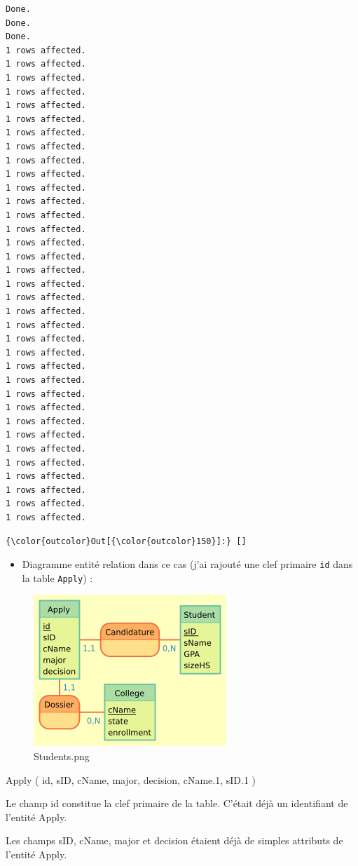 \documentclass[11pt]{article}
\makeatletter
\def\maxwidth{\ifdim\Gin@nat@width>\linewidth\linewidth
    \else\Gin@nat@width\fi}
\let\Oldincludegraphics\includegraphics
\renewcommand{\includegraphics}[1]{\Oldincludegraphics[width=.8\maxwidth]{#1}}
\providecommand{\tightlist}{%
      \setlength{\itemsep}{0pt}\setlength{\parskip}{0pt}}
\makeatother
\begin{document}
    \begin{Verbatim}[commandchars=\\\{\}]
Done.
Done.
Done.
1 rows affected.
1 rows affected.
1 rows affected.
1 rows affected.
1 rows affected.
1 rows affected.
1 rows affected.
1 rows affected.
1 rows affected.
1 rows affected.
1 rows affected.
1 rows affected.
1 rows affected.
1 rows affected.
1 rows affected.
1 rows affected.
1 rows affected.
1 rows affected.
1 rows affected.
1 rows affected.
1 rows affected.
1 rows affected.
1 rows affected.
1 rows affected.
1 rows affected.
1 rows affected.
1 rows affected.
1 rows affected.
1 rows affected.
1 rows affected.
1 rows affected.
1 rows affected.
1 rows affected.
1 rows affected.
1 rows affected.

    \end{Verbatim}

\begin{Verbatim}[commandchars=\\\{\}]
{\color{outcolor}Out[{\color{outcolor}150}]:} []
\end{Verbatim}
            
    \begin{itemize}
\tightlist
\item
  Diagramme entité relation dans ce cas (j'ai rajouté une clef primaire
  \texttt{id} dans la table \texttt{Apply}) :
\end{itemize}

\begin{figure}
\centering
\includegraphics{mocodo/Stanford/Students.png}
\caption{Students.png}
\end{figure}

\hypertarget{mld}{}
{Apply} ( {id}, {sID}, {cName}, {major}, {decision}, {cName.1}, {sID.1}
)

Le champ id constitue la clef primaire de la table. C'était déjà un
identifiant de l'entité Apply.

Les champs sID, cName, major et decision étaient déjà de simples
attributs de l'entité Apply.
\end{document}
